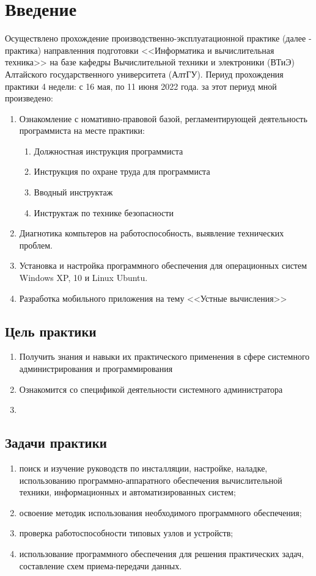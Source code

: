 \documentclass[a4paper, 12pt]{article}
\begin{document}
\section{Введение}
Осуществлено прохождение производственно-эксплуатационной практике (далее - практика) направленния подготовки <<Информатика и вычислительная техника>> на базе кафедры Вычислительной техники и электроники (ВТиЭ) Алтайского государственного университета (АлтГУ).  
Периуд прохождения практики 4 недели: с 16 мая, по 11 июня 2022 года. за этот периуд мной произведено:
\begin{enumerate}
  \item Ознакомление с номативно-правовой базой, регламентирующей деятельность программиста на месте практики:
  \begin{enumerate}
    \item Должностная инструкция программиста
    \item Инструкция по охране труда для программиста
    \item Вводный инструктаж
    \item Инструктаж по технике безопасности
  \end{enumerate}
  \item Диагнотика компьтеров на работоспособность, выявление технических проблем.
  \item Установка и настройка программного обеспечения для операционных систем Windows XP, 10 и Linux Ubuntu.
  \item Разработка мобильного приложения на тему <<Устные вычисления>>
\end{enumerate} 

\subsection*{Цель практики}
\begin{enumerate}
  \item Получить знания и навыки их практического применения в сфере системного администрирования и программирования
  \item Ознакомится со спецификой деятельности системного администратора
  \item 
\end{enumerate}

\subsection*{Задачи практики}
\begin{enumerate}
  \item  поиск и изучение руководств по инсталляции, настройке, наладке, использованию программно-аппаратного обеспечения вычислительной техники, информационных и автоматизированных систем;
  \item  освоение методик использования необходимого программного обеспечения;
  \item  проверка работоспособности типовых узлов и устройств;
  \item  использование программного обеспечения для решения практических задач, составление схем приема-передачи данных.
\end{enumerate}
\end{document}
